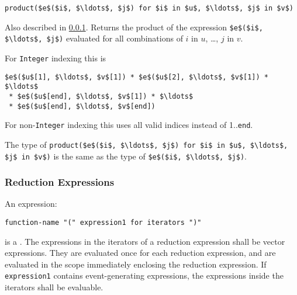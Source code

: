 \begin{operatordefinition*}[product]\label{modelica:product-reduction}
\begin{synopsis}\begin{lstlisting}
product($e$($i$, $\ldots$, $j$) for $i$ in $u$, $\ldots$, $j$ in $v$)
\end{lstlisting}\end{synopsis}
\begin{semantics}
Also described in \cref{reduction-expressions}.  Returns the product of the expression \lstinline!$e$($i$, $\ldots$, $j$)! evaluated for all combinations of $i$ in $u$, \ldots, $j$ in $v$.

For \lstinline!Integer! indexing this is
\begin{lstlisting}[language=modelica]
$e$($u$[1], $\ldots$, $v$[1]) * $e$($u$[2], $\ldots$, $v$[1]) * $\ldots$
 * $e$($u$[end], $\ldots$, $v$[1]) * $\ldots$
 * $e$($u$[end], $\ldots$, $v$[end])
\end{lstlisting}
For non-\lstinline!Integer! indexing this uses all valid indices instead of 1..\lstinline!end!.

The type of \lstinline!product($e$($i$, $\ldots$, $j$) for $i$ in $u$, $\ldots$, $j$ in $v$)! is the same as the type of \lstinline!$e$($i$, $\ldots$, $j$)!.
\end{semantics}
\end{operatordefinition*}

\subsubsection{Reduction Expressions}\label{reduction-expressions}

An expression:
\begin{lstlisting}[language=grammar]
function-name "(" expression1 for iterators ")"
\end{lstlisting}%
is a .
The expressions in the iterators of a reduction expression shall be vector expressions.
They are evaluated once for each reduction expression, and are evaluated in the scope immediately enclosing the reduction expression.
If \lstinline!expression1! contains event-generating expressions, the expressions inside the iterators shall be evaluable.

